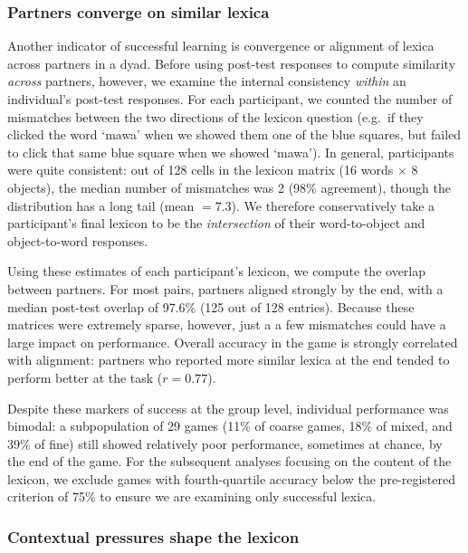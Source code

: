 \subsubsection{Partners converge on similar lexica}

Another indicator of successful learning is convergence or alignment of lexica across partners in a dyad. Before using post-test responses to compute similarity \emph{across} partners, however, we examine the internal consistency \emph{within} an individual's post-test responses. For each participant, we counted the number of mismatches between the two directions of the lexicon question (e.g.\ if they clicked the word `mawa' when we showed them one of the blue squares, but failed to click that same blue square when we showed `mawa'). In general, participants were quite consistent: out of 128 cells in the lexicon matrix (16 words $\times$ 8 objects), the median number of mismatches was 2 (98\% agreement), though the distribution has a long tail (mean $= 7.3$). We therefore conservatively take a participant's final lexicon to be the \emph{intersection} of their word-to-object and object-to-word responses.

Using these estimates of each participant's lexicon, we compute the overlap between partners. For most pairs, partners aligned strongly by the end, with a median post-test overlap of 97.6\% (125 out of 128 entries). Because these matrices were extremely sparse, however, just a a few mismatches could have a large impact on performance. Overall accuracy in the game is strongly correlated with alignment: partners who reported more similar lexica at the end tended to perform better at the task ($r = 0.77$).  

Despite these markers of success at the group level, individual performance was bimodal: a subpopulation of 29 games (11\% of coarse games, 18\% of mixed, and 39\% of fine) still showed relatively poor performance, sometimes at chance, by the end of the game. For the subsequent analyses focusing on the content of the lexicon, we exclude games with fourth-quartile accuracy below the pre-registered criterion of 75\% to ensure we are examining only successful lexica. %

\subsubsection{Contextual pressures shape the lexicon}

